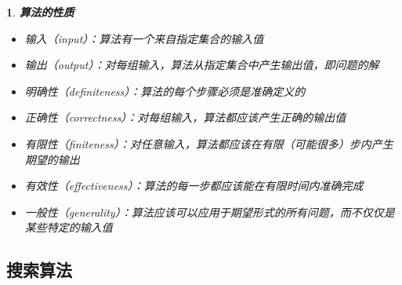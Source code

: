 \documentclass[UTF8]{report}
\theoremstyle{MyLineTheoremStyle} %
\theoremstyle{MyBlockTheoremStyle} %
\theoremstyle{MySubsubsectionStyle} %
\newtheorem{definition}{}
\begin{document}
\begin{definition}
    \textbf{算法的性质}\par
    \begin{itemize}
        \item 输入（input）：算法有一个来自指定集合的输入值
        \item 输出（output）：对每组输入，算法从指定集合中产生输出值，即问题的解
        \item 明确性（definiteness）：算法的每个步骤必须是准确定义的
        \item 正确性（correctness）：对每组输入，算法都应该产生正确的输出值
        \item 有限性（finiteness）：对任意输入，算法都应该在有限（可能很多）步内产生期望的输出
        \item 有效性（effectiveness）：算法的每一步都应该能在有限时间内准确完成
        \item 一般性（generality）：算法应该可以应用于期望形式的所有问题，而不仅仅是某些特定的输入值
    \end{itemize}
\end{definition}

\subsection{搜索算法}
\end{document}
